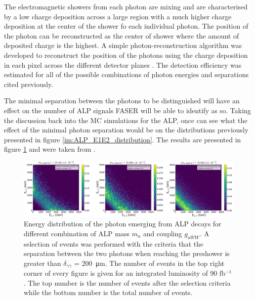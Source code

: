 		The electromagnetic showers from each photon are mixing and are characterised by a low charge deposition across a large region with a much higher charge deposition at the center of the shower fo each individual photon. The position of the photon can be reconstructed as the center of shower where the amount of deposited charge is the highest. A simple photon-reconstruction algorithm was developed to reconstruct the position of the photons using the charge deposition in each pixel across the different detector planes \cite{PreShower_TP}. The detection efficiency was estimated for all of the possible combinations of photon energies and separations cited previously.  
		
		The minimal separation between the photons to be distinguished will have an effect on the number of ALP signals FASER will be able to identify as so. Taking the discussion back into the MC simulations for the ALP, once can see what the effect of the minimal photon separation would be on the distributions previously presented in figure \ref{im:ALP_E1E2_distribution}. The results are presented in figure \ref{im:ALP_E1E2_distribution_cut} and were taken from \cite{Moretti_MasterThesis}. 
		 
		\begin{figure}[h]
			\centering
			\includegraphics[width=1.0\linewidth]{files/ALP_E1E2_energy_cut}
			\caption{Energy distribution of the photon emerging from ALP decays for different combination of ALP mass $m_a$ and coupling $g_{aWW}$. A selection of events was performed with the criteria that the separation between the two photons when reaching the preshower is greater than $\delta_{\gamma\gamma}$ = \SI{200}{\micro\meter}. The number of events in the top right corner of every figure is given for an integrated luminosity of 90 fb$^{-1}$. The top number is the number of events after the selection criteria while the bottom number is the total number of events.}
			\label{im:ALP_E1E2_distribution_cut}
		\end{figure}
		
